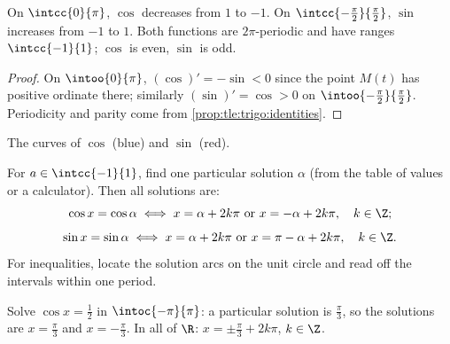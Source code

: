 \begin{proposition}[Variations]\label{prop:tle:trigo:variations}
On $\intcc{0}{\pi}$, $\cos$ decreases from $1$ to $-1$. On
$\intcc{-\frac\pi2}{\frac\pi2}$, $\sin$ increases from $-1$ to $1$. Both
functions are $2\pi$-periodic and have ranges $\intcc{-1}{1}$; $\cos$ is
even, $\sin$ is odd.
\end{proposition}

\begin{proof}
On $\intoo{0}{\pi}$, $(\cos)' = -\sin < 0$ since the point $M(t)$ has
positive ordinate there; similarly $(\sin)' = \cos > 0$ on
$\intoo{-\frac\pi2}{\frac\pi2}$. Periodicity and parity come from
\cref{prop:tle:trigo:identities}.
\end{proof}

\begin{omfigure}

{\small The curves of $\cos$ (blue) and $\sin$ (red).}
\end{omfigure}

\begin{method}[Solving $\cos x = a$ and $\sin x = a$]\label{met:tle:trigo:equations}
For $a \in \intcc{-1}{1}$, find one particular solution $\alpha$ (from the
table of values or a calculator). Then all solutions are:
\[
\cos x = \cos\alpha \iff x = \alpha + 2k\pi \text{ or } x = -\alpha + 2k\pi,
\quad k \in \Z;
\]
\[
\sin x = \sin\alpha \iff x = \alpha + 2k\pi \text{ or } x = \pi - \alpha + 2k\pi,
\quad k \in \Z.
\]
For inequalities, locate the solution arcs on the unit circle and read off
the intervals within one period.
\end{method}

\begin{example}\label{ex:tle:trigo:equation}
Solve $\cos x = \frac12$ in $\intoc{-\pi}{\pi}$: a particular solution is
$\frac\pi3$, so the solutions are $x = \frac\pi3$ and $x = -\frac\pi3$.
In all of $\R$: $x = \pm\frac\pi3 + 2k\pi$, $k \in \Z$.
\end{example}

